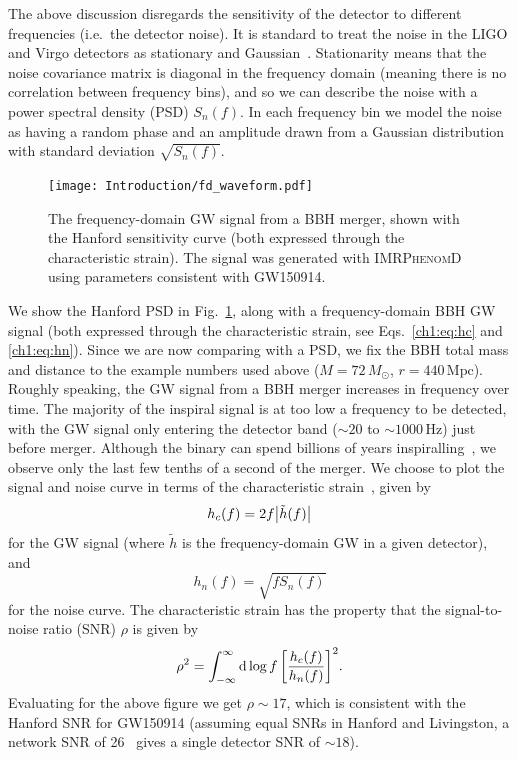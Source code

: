 The above discussion disregards the sensitivity of the detector to different frequencies (i.e.\ the detector noise).
It is standard to treat the noise in the LIGO and Virgo detectors as stationary and Gaussian~\cite{LIGOScientific:2019hgc}.
Stationarity means that the noise covariance matrix is diagonal in the frequency domain (meaning there is no correlation between frequency bins), and so we can describe the noise with a power spectral density (PSD) $S_n(f)$.
In each frequency bin we model the noise as having a random phase and an amplitude drawn from a Gaussian distribution with standard deviation $\sqrt{S_n(f)}$.
\begin{figure}
    \centering
    \texttt{[image: Introduction/fd\_waveform.pdf]}
    \caption[Frequency-domain gravitational-wave signal from a binary black-hole merger]{ 
    The frequency-domain GW signal from a BBH merger, shown with the Hanford sensitivity curve (both expressed through the characteristic strain). 
    The signal was generated with \textsc{IMRPhenomD} using parameters consistent with GW150914.
    }
    \label{ch1:fig:fd_waveform}
\end{figure}
We show the Hanford PSD in Fig.~\ref{ch1:fig:fd_waveform}, along with a frequency-domain BBH GW signal (both expressed through the characteristic strain, see Eqs.~\ref{ch1:eq:hc} and \ref{ch1:eq:hn}).
Since we are now comparing with a PSD, we fix the BBH total mass and distance to the example numbers used above ($M = 72\,M_\odot$, $r = 440\,\mathrm{Mpc}$).
Roughly speaking, the GW signal from a BBH merger increases in frequency over time.
The majority of the inspiral signal is at too low a frequency to be detected, with the GW signal only entering the detector band ($\sim 20$ to $\sim 1000\,\mathrm{Hz}$) just before merger.
Although the binary can spend billions of years inspiralling~\cite{Belczynski:2016obo, Rodriguez:2016avt}, we observe only the last few tenths of a second of the merger.
We choose to plot the signal and noise curve in terms of the characteristic strain~\cite{Moore:2014lga}, given by
\begin{equation}\label{ch1:eq:hc}
    h_c(f) = 2f\abs{\tilde{h}(f)}
\end{equation}
for the GW signal (where $\tilde{h}$ is the frequency-domain GW in a given detector), and
\begin{equation}\label{ch1:eq:hn}
    h_n(f) = \sqrt{fS_n(f)}
\end{equation}
for the noise curve.
The characteristic strain has the property that the signal-to-noise ratio (SNR) $\rho$ is given by
\begin{equation}
    \rho^2 = \int_{-\infty}^\infty \dd{\log{f}} \qty[\frac{h_c(f)}{h_n(f)}]^2.
\end{equation}
Evaluating for the above figure we get $\rho \sim 17$, which is consistent with the Hanford SNR for GW150914 (assuming equal SNRs in Hanford and Livingston, a network SNR of 26~\cite{LIGOScientific:2021usb} gives a single detector SNR of $\sim 18$).

